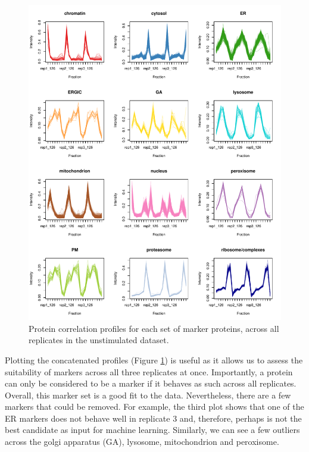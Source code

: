 \documentclass[9pt,a4paper,]{extarticle}
\begin{document}
\begin{figure}[H]

{\centering \includegraphics[width=1\linewidth,]{figs/mrk_profiles} 

}

\caption{Protein correlation profiles for each set of marker proteins, across all replicates in the unstimulated dataset.}\label{fig:mrk-prof-fig}
\end{figure}

Plotting the concatenated profiles (Figure \ref{fig:mrk-prof-fig}) is useful as
it allows us to assess the suitability of markers across all three replicates at
once. Importantly, a protein can only be considered to be a marker if it behaves
as such across all replicates. Overall, this marker set is a good fit to the
data. Nevertheless, there are a few markers that could be removed. For example,
the third plot shows that one of the ER markers does not behave well in
replicate 3 and, therefore, perhaps is not the best candidate as input for
machine learning. Similarly, we can see a few outliers across the golgi
apparatus (GA), lysosome, mitochondrion and peroxisome.
\end{document}
